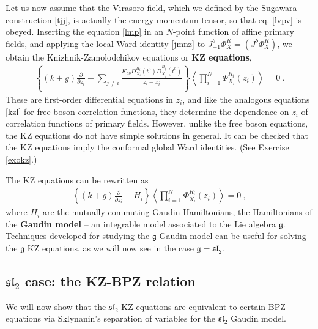 \documentclass[12pt, a4paper, notitlepage, twoside]{report}
\numberwithin{equation}{section}
\theoremstyle{break}
\begin{document}
Let us now assume that the Virasoro field, which we defined by the Sugawara construction \eqref{tjj}, is actually the energy-momentum tensor, so that eq. \eqref{lvpv} is obeyed.
Inserting the equation \eqref{lmp} in an $N$-point function of affine primary fields, and applying the local Ward identity \eqref{jmnz} to $J^b_{-1}\Phi^R_X = (J^b\Phi^R_X)$, we obtain the Knizhnik-Zamolodchikov equations or \textbf{\boldmath KZ equations},
\begin{align}
 \boxed{\left\{(k+g){\frac{\partial}{\partial z_i}} + \sum_{j\neq i} \frac{K_{ab}D_{X_i}^{R_i}(t^a)D_{X_j}^{R_j}(t^b)}{z_i-z_j}\right\}\left\langle \prod_{i=1}^N \Phi^{R_i}_{X_i}(z_i)\right\rangle  = 0}\ .
\label{kz} 
\end{align}
These are first-order differential equations in $z_i$, and like the analogous equations \eqref{kzl} for free boson correlation functions, they determine the dependence on $z_i$ of correlation functions of primary fields.
However, unlike the free boson equations, the KZ equations do not have simple solutions in general. 
It can be checked that the KZ equations imply the conformal global Ward identities. (See Exercise \ref{exokz}.)

The KZ equations can be rewritten as 
\begin{align}
 \left\{(k+g){\frac{\partial}{\partial z_i}} + H_i \right\}\left\langle \prod_{i=1}^N \Phi^{R_i}_{X_i}(z_i)\right\rangle   = 0 \ ,
\label{phz}
\end{align}
where $H_i$ are the mutually commuting Gaudin Hamiltonians, the Hamiltonians of the \textbf{\boldmath Gaudin model} -- an integrable model associated to the Lie algebra $\mathfrak{g}$.
Techniques developed for studying the $\mathfrak{g}$ Gaudin model can be useful for solving the $\mathfrak{g}$ KZ equations, as we will now see in the case $\mathfrak{g} = \mathfrak{sl}_2$. 


\subsection{\texorpdfstring{$\mathfrak{sl}_2$}{sl2} case: the KZ-BPZ relation} 

We will now show that the $\mathfrak{sl}_2$ KZ equations are equivalent to certain BPZ equations via Sklynanin's separation of variables for the $\mathfrak{sl}_2$ Gaudin model. 
\end{document}

